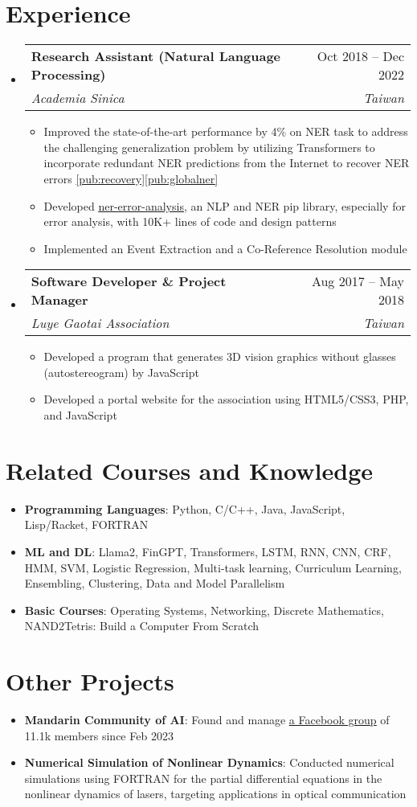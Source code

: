 \documentclass[letterpaper,11pt]{article}
\makeatletter
\newcommand{\resumeItem}[1]{
  \item\small{
    {#1 \vspace{-2pt}}
  }
}
\newcommand{\resumeSubheading}[4]{
  \vspace{-2pt}\item
    \begin{tabular*}{0.97\textwidth}[t]{l@{\extracolsep{\fill}}r}
      \textbf{#1} & #2 \\
      \textit{\small#3} & \textit{\small #4} \\
    \end{tabular*}\vspace{-7pt}
}
\newcommand{\resumeSubHeadingListStart}{\begin{itemize}[leftmargin=0.1in, label={}]}
\newcommand{\resumeSubHeadingListEnd}{\end{itemize}}
\newcommand{\resumeItemListStart}{\begin{itemize}}
\newcommand{\resumeItemListEnd}{\end{itemize}\vspace{-5pt}}
\newcommand{\titledItem}[2]{
  \item\small{
    {\textbf{#1}: #2 \vspace{-9pt}}
  }
}
\newcommand{\simpleListStart}{\begin{itemize}[leftmargin=0.15in, label={}]}
\newcommand{\simpleListEnd}{\end{itemize}\vspace{-5pt}}
\makeatother
\begin{document}
\section{Experience}
  \resumeSubHeadingListStart

    \resumeSubheading
      {Research Assistant (Natural Language Processing)}{Oct 2018 -- Dec 2022}
      {Academia Sinica}{Taiwan}
      \resumeItemListStart
        \resumeItem{Improved the state-of-the-art performance by 4\% on NER task to address the challenging generalization problem by utilizing Transformers to incorporate redundant NER predictions from the Internet to recover NER errors \ref{pub:recovery}\ref{pub:globalner}}
        \resumeItem{Developed \href{https://pypi.org/project/ner-error-analysis/}{\underline{ner-error-analysis}}, an NLP and NER pip library, especially for error analysis, with 10K+ lines of code and design patterns}
        \resumeItem{Implemented an Event Extraction and a Co-Reference Resolution module}
      \resumeItemListEnd
      \resumeSubheading
          {Software Developer \& Project Manager}{Aug 2017 -- May 2018}{Luye Gaotai Association}{Taiwan}
          \resumeItemListStart
            \resumeItem{Developed a program that generates 3D vision graphics without glasses (autostereogram) by JavaScript}
            \resumeItem{Developed a portal website for the association using HTML5/CSS3, PHP, and JavaScript}
          \resumeItemListEnd
  \resumeSubHeadingListEnd

\section{Related Courses and Knowledge}
 \simpleListStart
    \titledItem{Programming Languages}{Python, C/C++, Java, JavaScript, Lisp/Racket, FORTRAN}
    \titledItem{ML and DL}{Llama2, FinGPT, Transformers, LSTM, RNN, CNN, CRF, HMM, SVM, Logistic Regression, Multi-task learning, Curriculum Learning, Ensembling, Clustering, Data and Model Parallelism}
    \titledItem{Basic Courses}{Operating Systems, Networking, Discrete Mathematics, NAND2Tetris: Build a Computer From Scratch}
 \simpleListEnd

 \section{Other Projects}
    \simpleListStart
        \titledItem{Mandarin Community of AI}{Found and manage \href{https://www.facebook.com/groups/demoai}{\underline{a Facebook group}} of 11.1k members since Feb 2023}
        \titledItem{Numerical Simulation of Nonlinear Dynamics}{Conducted numerical simulations using FORTRAN for the partial differential equations in the nonlinear dynamics of lasers, targeting applications in optical communication}
    \simpleListEnd
\end{document}
